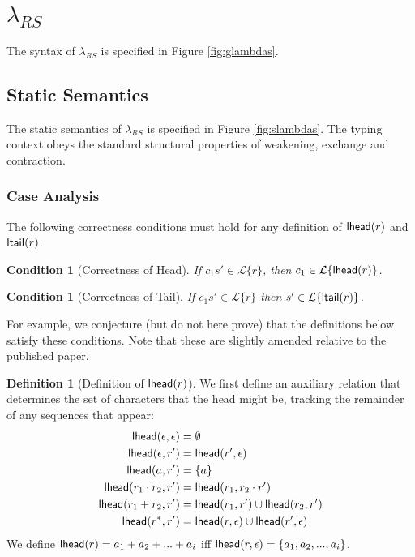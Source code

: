 \documentclass[11pt,leqno]{article}
\newtheorem{condition}[tr]{Condition}
\theoremstyle{definition}
\newtheorem{defn}[thm]{Definition}
\newcommand{\Lagr}{\mathcal{L}}
\newcommand{\lang}[1]{\Lagr\{#1\}}
\newcommand{\lambdas}{\lambda_{RS}}
\newcommand{\lhead}[1]{ {\sf lhead}(#1) }
\newcommand{\ltail}[1]{ {\sf ltail}(#1) }
\begin{document}
\section{$\lambdas$}
The syntax of $\lambdas$ is specified in Figure \ref{fig:glambdas}.

\subsection{Static Semantics}
The static semantics of $\lambdas$ is specified in Figure \ref{fig:slambdas}.  The typing context obeys the standard structural properties of weakening, exchange and contraction. 

\subsubsection{Case Analysis}
The following correctness conditions must hold for any definition of $\lhead{r}$ and $\ltail{r}$.

\begin{condition}[Correctness of Head] \label{trlemmax}
If $c_1  s' \in \lang{r}$, then
$c_1 \in \lang{\lhead{r}}$.
\end{condition}

\begin{condition}[Correctness of Tail] \label{trlemma:tail-correctness}
If $c_1 s' \in \lang{r}$ then $s' \in \lang{\ltail{r}}$.
\end{condition}

For example, we conjecture (but do not here prove) that the definitions below satisfy these conditions. Note that these are slightly amended relative to the published paper.

\begin{defn}[Definition of $\lhead{r}$]\label{def:lhead}
We first define an auxiliary relation that determines the set of characters that the head might be, tracking the remainder of any sequences that appear:
\begin{align*}
\lhead{\epsilon, \epsilon} &= \emptyset\\
\lhead{\epsilon, r'}      &= \lhead{r', \epsilon} \\
\lhead{a, r'}             &= \{a\} \\
\lhead{r_1\cdot r_2, r'}  &= \lhead{r_1, r_2 \cdot r'} \\
\lhead{r_1 + r_2, r'}     &= \lhead{r_1, r'} \cup \lhead{r_2, r'} \\
\lhead{r^*, r'}           &= \lhead{r, \epsilon} \cup \lhead{r', \epsilon}
\end{align*}
We define $\lhead{r} = a_1 + a_2 + ... + a_i$ iff $\lhead{r, \epsilon} = \{a_1, a_2, ..., a_i\}$.
\end{defn}
\end{document}
